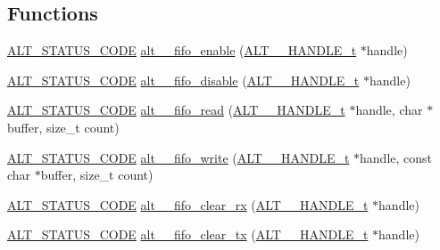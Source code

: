 \subsection*{Functions}
\begin{DoxyCompactItemize}
\item 
\mbox{\hyperlink{hwlib_8h_abdb0d369f069723ca55d6c94bcaaaa12}{A\+L\+T\+\_\+\+S\+T\+A\+T\+U\+S\+\_\+\+C\+O\+DE}} \mbox{\hyperlink{group__UART__FIFO_ga66e1f9e3c9e6f721699a780b763d2740}{alt\+\_\+\_\+fifo\+\_\+enable}} (\mbox{\hyperlink{group__UART__BASIC_ga4173f362f19fc04032c3859b78d78119}{A\+L\+T\+\_\+\_\+\+H\+A\+N\+D\+L\+E\+\_\+t}} $\ast$handle)
\item 
\mbox{\hyperlink{hwlib_8h_abdb0d369f069723ca55d6c94bcaaaa12}{A\+L\+T\+\_\+\+S\+T\+A\+T\+U\+S\+\_\+\+C\+O\+DE}} \mbox{\hyperlink{group__UART__FIFO_gad7fb867e11640ff283b08dac626f0a3c}{alt\+\_\+\_\+fifo\+\_\+disable}} (\mbox{\hyperlink{group__UART__BASIC_ga4173f362f19fc04032c3859b78d78119}{A\+L\+T\+\_\+\_\+\+H\+A\+N\+D\+L\+E\+\_\+t}} $\ast$handle)
\item 
\mbox{\hyperlink{hwlib_8h_abdb0d369f069723ca55d6c94bcaaaa12}{A\+L\+T\+\_\+\+S\+T\+A\+T\+U\+S\+\_\+\+C\+O\+DE}} \mbox{\hyperlink{group__UART__FIFO_ga0ce2f31d207024b0f240b2020ab6fd94}{alt\+\_\+\_\+fifo\+\_\+read}} (\mbox{\hyperlink{group__UART__BASIC_ga4173f362f19fc04032c3859b78d78119}{A\+L\+T\+\_\+\_\+\+H\+A\+N\+D\+L\+E\+\_\+t}} $\ast$handle, char $\ast$buffer, size\+\_\+t count)
\item 
\mbox{\hyperlink{hwlib_8h_abdb0d369f069723ca55d6c94bcaaaa12}{A\+L\+T\+\_\+\+S\+T\+A\+T\+U\+S\+\_\+\+C\+O\+DE}} \mbox{\hyperlink{group__UART__FIFO_ga8d30fc6d9735e51d61c10a5ff86c416e}{alt\+\_\+\_\+fifo\+\_\+write}} (\mbox{\hyperlink{group__UART__BASIC_ga4173f362f19fc04032c3859b78d78119}{A\+L\+T\+\_\+\_\+\+H\+A\+N\+D\+L\+E\+\_\+t}} $\ast$handle, const char $\ast$buffer, size\+\_\+t count)
\item 
\mbox{\hyperlink{hwlib_8h_abdb0d369f069723ca55d6c94bcaaaa12}{A\+L\+T\+\_\+\+S\+T\+A\+T\+U\+S\+\_\+\+C\+O\+DE}} \mbox{\hyperlink{group__UART__FIFO_ga13c485cb04682ee2e0cf1f4211caa02f}{alt\+\_\+\_\+fifo\+\_\+clear\+\_\+rx}} (\mbox{\hyperlink{group__UART__BASIC_ga4173f362f19fc04032c3859b78d78119}{A\+L\+T\+\_\+\_\+\+H\+A\+N\+D\+L\+E\+\_\+t}} $\ast$handle)
\item 
\mbox{\hyperlink{hwlib_8h_abdb0d369f069723ca55d6c94bcaaaa12}{A\+L\+T\+\_\+\+S\+T\+A\+T\+U\+S\+\_\+\+C\+O\+DE}} \mbox{\hyperlink{group__UART__FIFO_ga434291ab9cc63426ae1d2966ddbc3be8}{alt\+\_\+\_\+fifo\+\_\+clear\+\_\+tx}} (\mbox{\hyperlink{group__UART__BASIC_ga4173f362f19fc04032c3859b78d78119}{A\+L\+T\+\_\+\_\+\+H\+A\+N\+D\+L\+E\+\_\+t}} $\ast$handle)

\end{DoxyCompactItemize}
